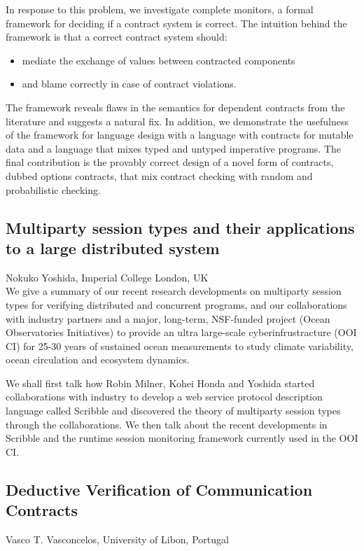 \documentclass[11pt]{article}
\begin{document}
In response to this problem, we investigate complete monitors, a
formal framework for deciding if a contract system is correct. The
intuition behind the framework is that a correct contract system
should:
\begin{itemize}
\item mediate the exchange of values between contracted components
\item and blame correctly in case of contract violations.
\end{itemize}
The framework reveals flaws in the semantics for dependent contracts
from the literature and suggests a natural fix. In addition, we
demonstrate the usefulness of the framework for language design with a
language with contracts for mutable data and a language that mixes
typed and untyped imperative programs. The final contribution is the
provably correct design of a novel form of contracts, dubbed options
contracts, that mix contract checking with random and probabilistic
checking.

\subsection*{Multiparty session types and their applications to a large distributed system}
\noindent Nokuko Yoshida, Imperial College London, UK \\[0.5ex]

We give a summary of our recent research developments on multiparty
session types for verifying distributed and concurrent programs, and
our collaborations with industry partners and a major, long-term,
NSF-funded project (Ocean Observatories Initiatives) to provide an
ultra large-scale cyberinfrustracture (OOI CI) for 25-30 years of
sustained ocean measurements to study climate variability, ocean
circulation and ecosystem dynamics.

We shall first talk how Robin Milner, Kohei Honda and Yoshida started
collaborations with industry to develop a web service protocol
description language called Scribble and discovered the theory of
multiparty session types through the collaborations.  We then talk
about the recent developments in Scribble and the runtime session
monitoring framework currently used in the OOI CI.

\subsection*{Deductive Verification of Communication Contracts}
\noindent Vasco T. Vasconcelos, University of Libon, Portugal \\[0.5ex]
\end{document}
